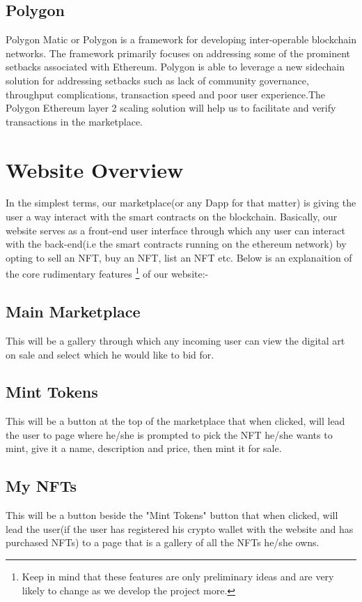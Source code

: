 \documentclass[a4paper,12pt]{article}
\begin{document}
\subsection{Polygon}

Polygon Matic or Polygon is a framework for developing inter-operable blockchain networks. The framework primarily focuses on addressing some of the prominent setbacks associated with Ethereum. Polygon is able to leverage a new sidechain solution for addressing setbacks such as lack of community governance, throughput complications, transaction speed and poor user experience.The Polygon Ethereum layer 2 scaling solution will help us to facilitate and verify transactions in the marketplace. 




\section{Website Overview}
In the simplest terms, our marketplace(or any Dapp for that matter) is giving the user a way interact with the smart contracts on the blockchain. Basically, our website serves as a front-end user interface through which any user can interact with the back-end(i.e the smart contracts running on the ethereum network) by opting to sell an NFT, buy an NFT, list an NFT etc. Below is an explanaition of the core rudimentary features \footnote{Keep in mind that these features are only preliminary ideas and are very likely to change as we develop the project more.} of our website:-
\subsection{Main Marketplace}
This will be a gallery through which any incoming user can view the digital art on sale and select which he would like to bid for.
\subsection{Mint Tokens}
This will be a button at the top of the marketplace that when clicked, will lead the user to page where he/she is prompted to pick the NFT he/she wants to mint, give it a name, description and price, then mint it for sale. 
\subsection{My NFTs}
This will be a button beside the "Mint Tokens" button that when clicked, will lead the user(if the user has registered his crypto wallet with the website and has purchased  NFTs) to a page that is a gallery of all the NFTs he/she owns.
\end{document}
